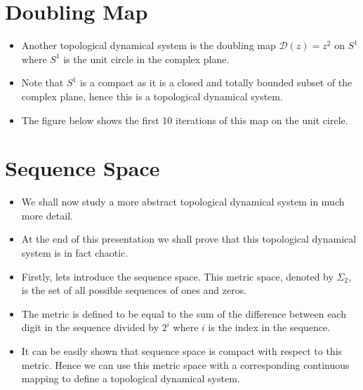 \documentclass{article}
\begin{document}
    \section{Doubling Map}
    \begin{itemize}
        \item Another topological dynamical system is the doubling map $\mathcal{D}(z) = z^2$ on $S^1$ where $S^1$ is the unit circle in the complex plane.
        \item Note that $S^1$ is a compact as it is a closed and totally bounded subset of the complex plane, hence this is a topological dynamical system.
        \item The figure below shows the first 10 iterations of this map on the unit circle.
    \end{itemize}

    \section{Sequence Space}
    \begin{itemize}
        \item We shall now study a more abstract topological dynamical system in much more detail. 
        \item At the end of this presentation we shall prove that this topological dynamical system is in fact chaotic. 
        \item Firstly, lets introduce the sequence space. This metric space, denoted by $\Sigma_2$, is the set of all possible sequences of ones and zeros.
        \item The metric is defined to be equal to the sum of the difference between each digit in the sequence divided by $2^i$ where $i$ is the index in the sequence.
        \item It can be easily shown that sequence space is compact with respect to this metric. Hence we can use this metric space with a corresponding continuous mapping to define a topological dynamical system.
    \end{itemize}
\end{document}
